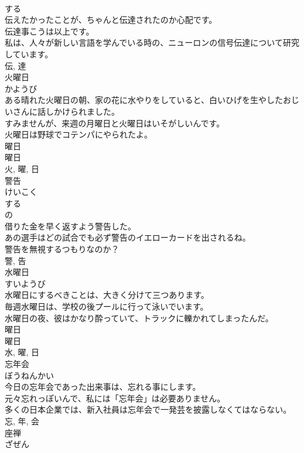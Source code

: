 \documentclass[8pt]{extreport}
\begin{document}
\begin{CJK}{UTF8}{min}
\\	する 
\\	伝えたかったことが、ちゃんと伝達されたのか心配です。	
\\	伝達事こうは以上です。	
\\	私は、人々が新しい言語を学んでいる時の、ニューロンの信号伝達について研究しています。	
\\	伝, 達	
\\	火曜日	
\\	かようび	
\\	ある晴れた火曜日の朝、家の花に水やりをしていると、白いひげを生やしたおじいさんに話しかけられました。	
\\	すみませんが、来週の月曜日と火曜日はいそがしいんです。	
\\	火曜日は野球でコテンパにやられたよ。	
\\	曜日 
\\	曜日 
\\	火, 曜, 日	
\\	警告	
\\	けいこく	
\\	する 
\\	の 
\\	借りた金を早く返すよう警告した。	
\\	あの選手はどの試合でも必ず警告のイエローカードを出されるね。	
\\	警告を無視するつもりなのか？	
\\	警, 告	
\\	水曜日	
\\	すいようび	
\\	水曜日にするべきことは、大きく分けて三つあります。	
\\	毎週水曜日は、学校の後プールに行って泳いでいます。	
\\	水曜日の夜、彼はかなり酔っていて、トラックに轢かれてしまったんだ。	
\\	曜日 
\\	曜日 
\\	水, 曜, 日	
\\	忘年会	
\\	ぼうねんかい	
\\	今日の忘年会であった出来事は、忘れる事にします。	
\\	元々忘れっぽいんで、私には「忘年会」は必要ありません。	
\\	多くの日本企業では、新入社員は忘年会で一発芸を披露しなくてはならない。	
\\	忘, 年, 会	
\\	座禅	
\\	ざぜん	

\end{CJK}
\end{document}
